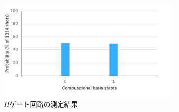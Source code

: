 \begin{frame}
\begin{columns}
\begin{column}{0.5\textwidth}
\begin{itemize}
\begin{columns}
\begin{column}{0.4\textwidth}
\begin{figure}
            \end{figure}
          \end{column}
        \end{columns}
      \end{itemize}
    \end{column}
    \begin{column}{0.5\textwidth}
      \begin{figure}
        \includegraphics[width=0.95\textwidth]{./img/hgate_histogram.pdf}
        \caption{$H$ゲート回路の測定結果}
        \label{fig:hgate_result}
      \end{figure}
    \end{column}
  \end{columns}
\end{frame}

